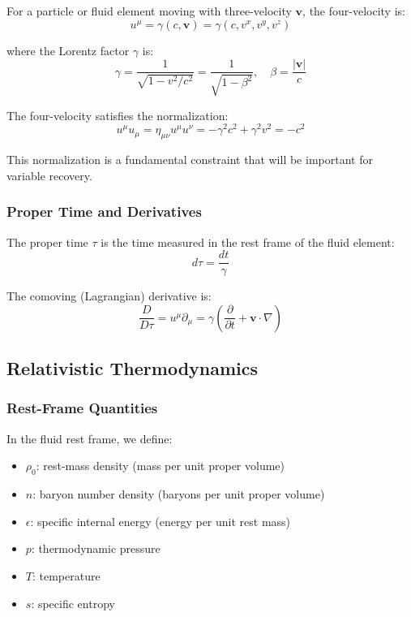 \documentclass[12pt,a4paper]{article}
\begin{document}
For a particle or fluid element moving with three-velocity $\bm{v}$, the four-velocity is:
\begin{equation}
u^\mu = \gamma(c, \bm{v}) = \gamma(c, v^x, v^y, v^z)
\label{eq:four_velocity}
\end{equation}

where the Lorentz factor $\gamma$ is:
\begin{equation}
\gamma = \frac{1}{\sqrt{1 - v^2/c^2}} = \frac{1}{\sqrt{1 - \beta^2}}, \quad \beta = \frac{|\bm{v}|}{c}
\label{eq:lorentz_factor}
\end{equation}

The four-velocity satisfies the normalization:
\begin{equation}
u^\mu u_\mu = \eta_{\mu\nu} u^\mu u^\nu = -\gamma^2 c^2 + \gamma^2 v^2 = -c^2
\label{eq:four_velocity_norm}
\end{equation}

This normalization is a fundamental constraint that will be important for variable recovery.

\subsubsection{Proper Time and Derivatives}

The proper time $\tau$ is the time measured in the rest frame of the fluid element:
\begin{equation}
d\tau = \frac{dt}{\gamma}
\label{eq:proper_time}
\end{equation}

The comoving (Lagrangian) derivative is:
\begin{equation}
\frac{D}{D\tau} = u^\mu \partial_\mu = \gamma\left(\frac{\partial}{\partial t} + \bm{v} \cdot \nabla\right)
\label{eq:comoving_derivative}
\end{equation}

\subsection{Relativistic Thermodynamics}

\subsubsection{Rest-Frame Quantities}

In the fluid rest frame, we define:
\begin{itemize}
    \item $\rho_0$: rest-mass density (mass per unit proper volume)
    \item $n$: baryon number density (baryons per unit proper volume)
    \item $\epsilon$: specific internal energy (energy per unit rest mass)
    \item $p$: thermodynamic pressure
    \item $T$: temperature
    \item $s$: specific entropy
\end{itemize}
\end{document}
